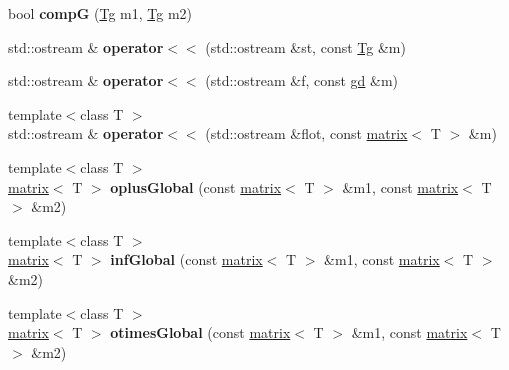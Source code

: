 \begin{DoxyCompactItemize}
bool {\bfseries compG} (\mbox{\hyperlink{classetvo_i_i_1_1_tg}{Tg}} m1, \mbox{\hyperlink{classetvo_i_i_1_1_tg}{Tg}} m2)
\item 
\mbox{\label{namespaceetvo_i_i_a27ad8b74b217358d673d1f35f50c9fb2}} 
std\+::ostream \& {\bfseries operator$<$$<$} (std\+::ostream \&st, const \mbox{\hyperlink{classetvo_i_i_1_1_tg}{Tg}} \&m)
\item 
\mbox{\label{namespaceetvo_i_i_aef771f0fae9b52a0d3c8dffae16a466c}} 
std\+::ostream \& {\bfseries operator$<$$<$} (std\+::ostream \&f, const \mbox{\hyperlink{classetvo_i_i_1_1gd}{gd}} \&m)
\item 
\mbox{\label{namespaceetvo_i_i_adc0efc706494f0fcfcba0c15996787c8}} 
{\footnotesize template$<$class T $>$ }\\std\+::ostream \& {\bfseries operator$<$$<$} (std\+::ostream \&flot, const \mbox{\hyperlink{classetvo_i_i_1_1matrix}{matrix}}$<$ T $>$ \&m)
\item 
\mbox{\label{namespaceetvo_i_i_a75f0cfa3147c81fb9898ced26e212bc6}} 
{\footnotesize template$<$class T $>$ }\\\mbox{\hyperlink{classetvo_i_i_1_1matrix}{matrix}}$<$ T $>$ {\bfseries oplus\+Global} (const \mbox{\hyperlink{classetvo_i_i_1_1matrix}{matrix}}$<$ T $>$ \&m1, const \mbox{\hyperlink{classetvo_i_i_1_1matrix}{matrix}}$<$ T $>$ \&m2)
\item 
\mbox{\label{namespaceetvo_i_i_a16c82a804fc13a5dcbff2ef56ee4fe37}} 
{\footnotesize template$<$class T $>$ }\\\mbox{\hyperlink{classetvo_i_i_1_1matrix}{matrix}}$<$ T $>$ {\bfseries inf\+Global} (const \mbox{\hyperlink{classetvo_i_i_1_1matrix}{matrix}}$<$ T $>$ \&m1, const \mbox{\hyperlink{classetvo_i_i_1_1matrix}{matrix}}$<$ T $>$ \&m2)
\item 
\mbox{\label{namespaceetvo_i_i_afecb310378949772734145cd40068fa4}} 
{\footnotesize template$<$class T $>$ }\\\mbox{\hyperlink{classetvo_i_i_1_1matrix}{matrix}}$<$ T $>$ {\bfseries otimes\+Global} (const \mbox{\hyperlink{classetvo_i_i_1_1matrix}{matrix}}$<$ T $>$ \&m1, const \mbox{\hyperlink{classetvo_i_i_1_1matrix}{matrix}}$<$ T $>$ \&m2)
\item 

\end{DoxyCompactItemize}
